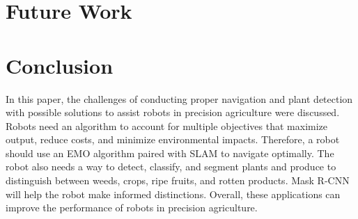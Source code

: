 \documentclass[12pt]{article}
\begin{document}
\section{Future Work}


\section{Conclusion}
In this paper, the challenges of conducting proper navigation and plant detection with possible solutions to assist robots in precision agriculture were discussed. Robots need an algorithm to account for multiple objectives that maximize output, reduce costs, and minimize environmental impacts. Therefore, a robot should use an EMO algorithm paired with SLAM to navigate optimally. The robot also needs a way to detect, classify, and segment plants and produce to distinguish between weeds, crops, ripe fruits, and rotten products. Mask R-CNN will help the robot make informed distinctions. Overall, these applications can improve the performance of robots in precision agriculture.



\end{document}
